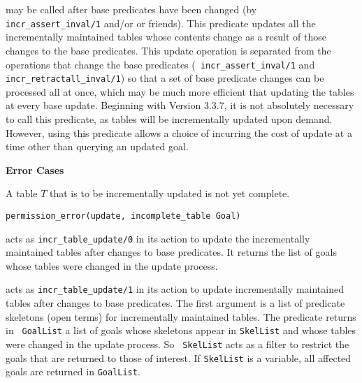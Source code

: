 \begin{description}
 may
be called after base predicates have been changed (by {\tt
  incr\_assert\_inval/1} and/or  or friends).  This predicate updates all
the incrementally maintained tables whose contents change as a result
of those changes to the base predicates.  This update operation is
separated from the operations that change the base predicates ({\tt
  incr\_assert\_inval/1} and {\tt incr\_retractall\_inval/1}) so that
a set of base predicate changes can be processed all at once, which
may be much more efficient that updating the tables at every base
update.  Beginning with Version 3.3.7, it is not absolutely necessary
to call this predicate, as tables will be incrementally updated upon
demand.  However, using this predicate allows a choice of incurring
the cost of update at a time other than querying an updated goal.

{\bf Error Cases}
\bi
\item A table $T$ that is to be incrementally updated is not yet
  complete.  
\bi
\item 	{\tt permission\_error(update, incomplete\_table Goal)}
\ei
\ei

acts as {\tt incr\_table\_update/0} in its action to update the
incrementally maintained tables after changes to base predicates.  It
returns the list of goals whose tables were changed in the update
process.

acts as {\tt incr\_table\_update/1} in its action to update
incrementally maintained tables after changes to base predicates.  The
first argument is a list of predicate skeletons (open terms) for
incrementally maintained tables.  The predicate returns in {\tt
  GoalList} a list of goals whose skeletons appear in {\tt SkelList}
and whose tables were changed in the update process.  So {\tt
  SkelList} acts as a filter to restrict the goals that are returned
to those of interest.  If {\tt SkelList} is a variable, all affected
goals are returned in {\tt GoalList}.


\end{description}
